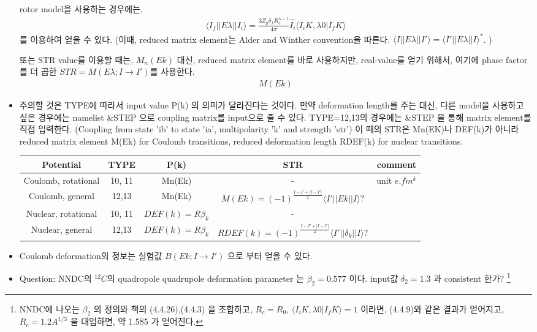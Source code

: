 \documentclass[11pt]{book}
\def\la{\langle}
\def\ra{\rangle}
\newcommand{\bea}{\begin{eqnarray}}
\newcommand{\eea}{\end{eqnarray}}
\begin{document}
\begin{itemize}
rotor model을 사용하는 경우에는, 
\bea 
\la I_f||E\lambda|| I_i\ra =\frac{3 Z_p \delta_\lambda R_c^{\lambda-1}}{4\pi}
                     \hat{I_i} \la I_i K,\lambda 0| I_f K\ra 
\eea 
를 이용하여 얻을 수 있다. 
(이때, reduced matrix element는 Alder and Winther convention을 따른다. 
$\la I||E\lambda||I'\ra= \la I'||E\lambda||I\ra^* $. )

또는 STR value를 이용할 때는, $M_n(Ek)$ 대신, reduced matrix element를 바로 사용하지만, 
real-value를 얻기 위해서, 여기에 phase factor를 더 곱한 $STR=M(E\lambda;I\to I')$를 사용한다. 
\bea 
M(Ek)
\eea 


\item 주의할 것은 TYPE에 따라서 input value P(k) 의 의미가 달라진다는 것이다. 
만약 deformation length를 주는 대신, 다른 model을 사용하고 싶은 경우에는
namelist \&STEP 으로 coupling matrix를 input으로 줄 수 있다. 
TYPE=12,13의 경우에는 \&STEP 을 통해 matrix element를 직접 입력한다.
(Coupling from state 'ib' to state 'ia', multipolarity 'k' and strength 'str')
이 때의 STR은 Mn(EK)나 DEF(k)가 아니라 
reduced matrix element M(Ek) for Coulomb transitions,
reduced deformation length RDEF(k) for nuclear transitions. 

\begin{table}[h] 
\begin{tabular}{c|c|c|c|c}
Potential & TYPE & P(k) & STR & comment \\
\hline 
Coulomb, rotational & 10, 11 & Mn(Ek) &  -  & unit $e.fm^k$ \\
Coulomb, general    & 12,13  & Mn(Ek) 
      & $M(Ek)=(-1)^{\frac{I-I'+|I-I'|}{2}}\la I'|| Ek||I\ra ?$ & \\
Nuclear, rotational & 10, 11 & $DEF(k)=R\beta_k$ & -  & \\     
Nuclear, general & 12,13 & $DEF(k)=R\beta_k$ 
     & $RDEF(k)=(-1)^{\frac{I-I'+|I-I'|}{2}}\la I'|| \delta_k ||I\ra? $
     & \\
\end{tabular}
\end{table} 

\item Coulomb deformation의 정보는 실험값 $B(Ek;I\to I')$ 으로 부터 얻을 수 있다.    

\item Question: NNDC의 ${}^{12}C$의 quadropole 
quadrupole deformation parameter 는 $\beta_2=0.577$ 이다.
input값 $\delta_2=1.3$ 과 consistent 한가? 
\footnote{NNDC에 나오는 $\beta_2$ 의 정의와 책의 (4.4.26),(4.4.3)
을 조합하고, $R_c=R_0$, $\la I_i K,\lambda 0|I_f K\ra=1$
이라면, (4.4.9)와 같은 결과가 얻어지고, $R_c=1.2 A^{1/3}$ 을 대입하면,
약 1.585 가 얻어진다. 
} 
\end{itemize} 
\end{document}
